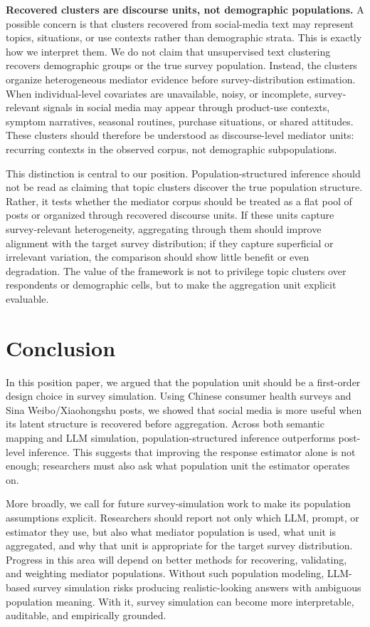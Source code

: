 \documentclass{article}
\begin{document}
\textbf{Recovered clusters are discourse units, not demographic populations.}
A possible concern is that clusters recovered from social-media text may represent topics,
situations, or use contexts rather than demographic strata. This is exactly how we interpret
them. We do not claim that unsupervised text clustering recovers demographic groups or the
true survey population. Instead, the clusters organize heterogeneous mediator evidence
before survey-distribution estimation. When individual-level covariates are unavailable, noisy, or incomplete, survey-relevant
signals in social media may appear through product-use contexts, symptom narratives,
seasonal routines, purchase situations, or shared attitudes. These clusters should therefore
be understood as discourse-level mediator units: recurring contexts in the observed corpus,
not demographic subpopulations.

This distinction is central to our position. Population-structured inference should not be
read as claiming that topic clusters discover the true population structure. Rather, it
tests whether the mediator corpus should be treated as a flat pool of posts or organized
through recovered discourse units. If these units capture survey-relevant heterogeneity, aggregating through them should
improve alignment with the target survey distribution; if they capture superficial or
irrelevant variation, the comparison should show little benefit or even degradation. The
value of the framework is not to privilege topic clusters over respondents or demographic
cells, but to make the aggregation unit explicit evaluable.

\section{Conclusion}
\label{sec:conclusion}

In this position paper, we argued that the population unit should be a first-order design choice in survey simulation.
Using Chinese consumer health surveys and Sina Weibo/Xiaohongshu posts, we showed that social media is more useful when its latent structure is recovered before aggregation.
Across both semantic mapping and LLM simulation, population-structured inference outperforms post-level inference.
This suggests that improving the response estimator alone is not enough; researchers must also ask what population unit the estimator operates on.

More broadly, we call for future survey-simulation work to make its population assumptions explicit.
Researchers should report not only which LLM, prompt, or estimator they use, but also what mediator population is used, what unit is aggregated, and why that unit is appropriate for the target survey distribution.
Progress in this area will depend on better methods for recovering, validating, and weighting mediator populations.
Without such population modeling, LLM-based survey simulation risks producing realistic-looking answers with ambiguous population meaning.
With it, survey simulation can become more interpretable, auditable, and empirically grounded.
\end{document}
